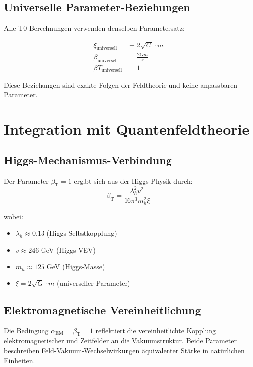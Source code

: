 \documentclass[12pt,a4paper]{article}
\newcommand{\betaT}{\beta_{\text{T}}}
\newcommand{\alphaEM}{\alpha_{\text{EM}}}
\begin{document}
	\subsection{Universelle Parameter-Beziehungen}
	\label{subsec:universelle_beziehungen}
	
	Alle T0-Berechnungen verwenden denselben Parametersatz:
	
	\begin{align} 
		\xi_{\text{universell}} &= 2\sqrt{G} \cdot m \\ 
		\beta_{\text{universell}} &= \frac{2Gm}{r} \\ 
		\beta T_{\text{universell}} &= 1 
	\end{align}
	
	Diese Beziehungen sind exakte Folgen der Feldtheorie und keine anpassbaren Parameter.
	
	\section{Integration mit Quantenfeldtheorie}
	\label{sec:qft_integration}
	
	\subsection{Higgs-Mechanismus-Verbindung}
	\label{subsec:higgs_verbindung}
	
	Der Parameter $\betaT = 1$ ergibt sich aus der Higgs-Physik durch:
	\begin{equation}
		\betaT = \frac{\lambda_h^2 v^2}{16\pi^3 m_h^2 \xi}
	\end{equation}
	
	wobei:
	\begin{itemize}
		\item $\lambda_h \approx 0.13$ (Higgs-Selbstkopplung)
		\item $v \approx 246$ GeV (Higgs-VEV)
		\item $m_h \approx 125$ GeV (Higgs-Masse)
		\item $\xi = 2\sqrt{G} \cdot m$ (universeller Parameter)
	\end{itemize}
	
	\subsection{Elektromagnetische Vereinheitlichung}
	\label{subsec:em_vereinheitlichung}
	
	Die Bedingung $\alphaEM = \betaT = 1$ reflektiert die vereinheitlichte Kopplung elektromagnetischer und Zeitfelder an die Vakuumstruktur. Beide Parameter beschreiben Feld-Vakuum-Wechselwirkungen äquivalenter Stärke in natürlichen Einheiten.
	
\end{document}
